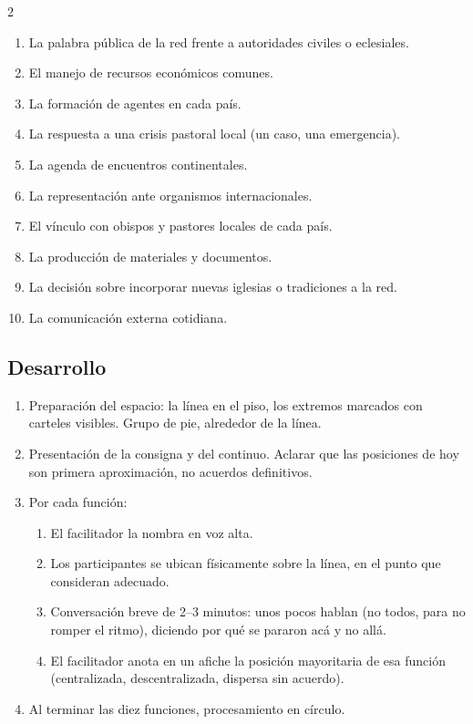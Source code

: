 \documentclass[11pt, a4paper]{article}
\begin{document}
\begin{actividad}
\begin{multicols}{2}
\begin{enumerate}[label={\arabic*.}]
  \item La palabra pública de la red frente a autoridades civiles o eclesiales.
  \item El manejo de recursos económicos comunes.
  \item La formación de agentes en cada país.
  \item La respuesta a una crisis pastoral local (un caso, una emergencia).
  \item La agenda de encuentros continentales.
  \item La representación ante organismos internacionales.
  \item El vínculo con obispos y pastores locales de cada país.
  \item La producción de materiales y documentos.
  \item La decisión sobre incorporar nuevas iglesias o tradiciones a la red.
  \item La comunicación externa cotidiana.
\end{enumerate}
\end{multicols}

\subsection*{Desarrollo}
\begin{enumerate}[label={\arabic*.}]
  \item Preparación del espacio: la línea en el piso, los extremos marcados con carteles visibles. Grupo de pie, alrededor de la línea.
  \item Presentación de la consigna y del continuo. Aclarar que las posiciones de hoy son primera aproximación, no acuerdos definitivos.
  \item Por cada función:
    \begin{enumerate}[label={\alph*.}]
      \item El facilitador la nombra en voz alta.
      \item Los participantes se ubican físicamente sobre la línea, en el punto que consideran adecuado.
      \item Conversación breve de 2--3 minutos: unos pocos hablan (no todos, para no romper el ritmo), diciendo por qué se pararon acá y no allá.
      \item El facilitador anota en un afiche la posición mayoritaria de esa función (centralizada, descentralizada, dispersa sin acuerdo).
    \end{enumerate}
  \item Al terminar las diez funciones, procesamiento en círculo.
\end{enumerate}


\end{actividad}
\end{document}
